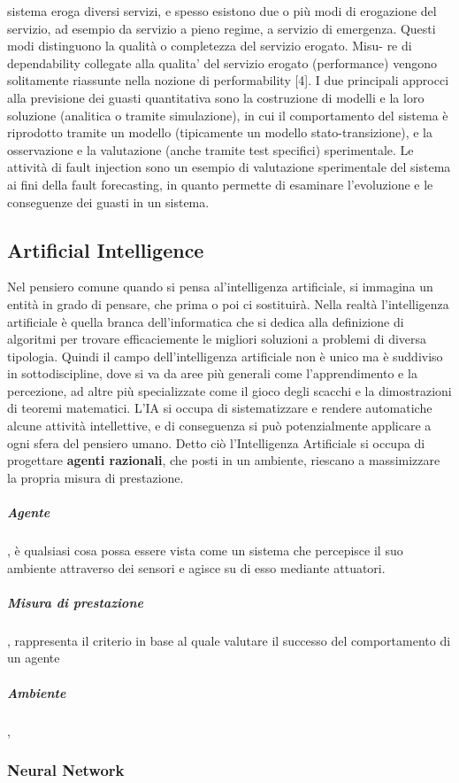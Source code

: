 \documentclass[14pt]{extarticle}
\begin{document}
sistema eroga diversi servizi, e spesso esistono due o più modi di erogazione
del servizio, ad esempio da servizio a pieno regime, a servizio di emergenza.
Questi modi distinguono la qualità o completezza del servizio erogato. Misu-
re di dependability collegate alla qualita’ del servizio erogato (performance)
vengono solitamente riassunte nella nozione di performability [4].
I due principali approcci alla previsione dei guasti quantitativa sono la
costruzione di modelli e la loro soluzione (analitica o tramite simulazione), in
cui il comportamento del sistema è riprodotto tramite un modello (tipicamente
un modello stato-transizione), e la osservazione e la valutazione (anche tramite
test specifici) sperimentale. Le attività di fault injection sono un esempio di
valutazione sperimentale del sistema ai fini della fault forecasting, in quanto
permette di esaminare l’evoluzione e le conseguenze dei guasti in un sistema.


\subsection{Artificial Intelligence}
Nel pensiero comune quando si pensa al'intelligenza artificiale, si immagina un entità in grado di pensare, che prima o poi ci sostituirà. Nella realtà l'intelligenza artificiale è quella branca dell'informatica che si dedica alla definizione di algoritmi per trovare efficaciemente le migliori soluzioni a problemi di diversa tipologia. Quindi il campo dell'intelligenza artificiale non è unico ma è suddiviso in sottodiscipline, dove si va da aree più generali come l'apprendimento e la percezione, ad altre più specializzate come il gioco degli scacchi e la dimostrazioni di teoremi matematici.
L'IA si occupa di sistematizzare e rendere automatiche alcune attività intellettive, e di conseguenza si può potenzialmente applicare a ogni sfera del pensiero umano. 
Detto ciò l'Intelligenza Artificiale si occupa di progettare \textbf{agenti razionali}, che posti in un ambiente, riescano a massimizzare la propria misura di prestazione.
\subparagraph{Agente}, è qualsiasi cosa possa essere vista come un sistema che percepisce il suo ambiente attraverso dei sensori e agisce su di esso mediante attuatori.
\subparagraph{Misura di prestazione}, rappresenta il criterio in base al quale valutare il successo del comportamento di un agente

\subparagraph{Ambiente}, 

\subsubsection{Neural Network}
\end{document}
